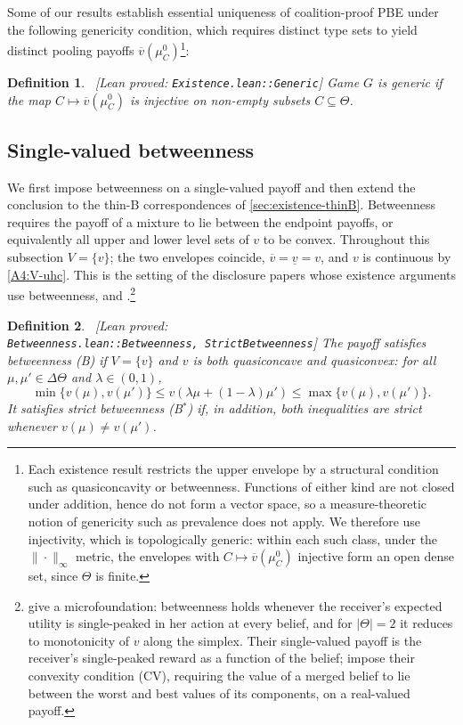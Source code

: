 \documentclass[11pt]{article}
\newtheorem{definition}{Definition}
\newcommand{\leanproved}[1]{{\footnotesize\textsf{\textcolor{green!55!black}{[Lean proved: \texttt{#1}]}}}}
\begin{document}
Some of our results establish essential uniqueness of coalition-proof PBE under the following genericity condition, which requires distinct type sets to yield distinct pooling payoffs $\overline{v}(\mu^0_C)$\footnote{Each existence result restricts the upper envelope by a structural condition such as quasiconcavity or betweenness. Functions of either kind are not closed under addition, hence do not form a vector space, so a measure-theoretic notion of genericity such as prevalence \parencite{huntsaueryorke} does not apply. We therefore use injectivity, which is topologically generic: within each such class, under the $\|\cdot\|_\infty$ metric, the envelopes with $C\mapsto\overline{v}(\mu^0_C)$ injective form an open dense set, since $\Theta$ is finite.}:
\begin{definition}\label{dfn:generic}\ \leanproved{Existence.lean::Generic}
    Game $G$ is \emph{generic} if the map $C\mapsto\overline{v}(\mu^0_C)$ is injective on non-empty subsets $C\subseteq\Theta$.
\end{definition}

\subsection{Single-valued betweenness}\label{sec:existence-betweenness}

We first impose betweenness on a single-valued payoff and then extend the conclusion to the thin-B correspondences of \cref{sec:existence-thinB}. Betweenness requires the payoff of a mixture to lie between the endpoint payoffs, or equivalently all upper and lower level sets of $v$ to be convex. Throughout this subsection $V=\{v\}$; the two envelopes coincide, $\overline v=\underline v=v$, and $v$ is continuous by \cref{A4:V-uhc}. This is the setting of the disclosure papers whose existence arguments use betweenness, \textcite{hart2017} and \textcite{bertomeucianciaruso}.\footnote{\textcite{hart2017} give a microfoundation: betweenness holds whenever the receiver's expected utility is single-peaked in her action at every belief, and for $|\Theta|=2$ it reduces to monotonicity of $v$ along the simplex. Their single-valued payoff is the receiver's single-peaked reward as a function of the belief; \textcite{bertomeucianciaruso} impose their convexity condition (CV), requiring the value of a merged belief to lie between the worst and best values of its components, on a real-valued payoff.}

\begin{definition}\label{dfn:B}\ \leanproved{Betweenness.lean::Betweenness,\ StrictBetweenness}
    The payoff satisfies \emph{betweenness} (B) if $V=\{v\}$ and $v$ is both quasiconcave and quasiconvex: for all $\mu,\mu'\in\Delta\Theta$ and $\lambda\in(0,1)$,
    \[
        \min\{v(\mu),v(\mu')\}
        \leq
        v(\lambda\mu+(1-\lambda)\mu')
        \leq
        \max\{v(\mu),v(\mu')\}.
    \]
    It satisfies \emph{strict betweenness} (B$^*$) if, in addition, both inequalities are strict whenever $v(\mu)\neq v(\mu')$.
\end{definition}
\end{document}
